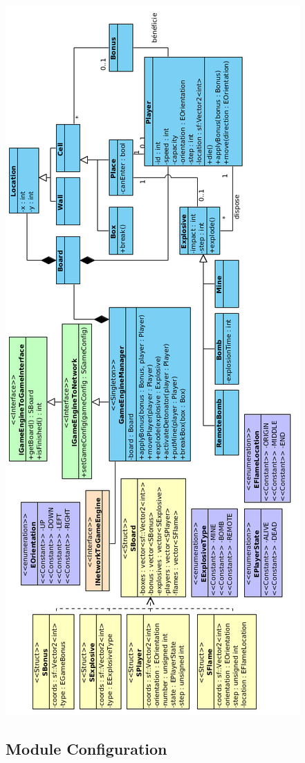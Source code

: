 \begin{center}
\includegraphics[scale=0.58]{images/UML/gameEngine.png}
\end{center}

\subsection{Module Configuration}

